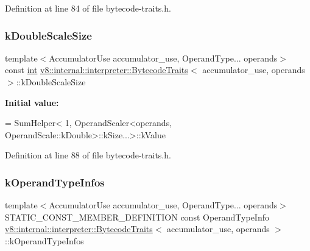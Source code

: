 Definition at line 84 of file bytecode-\/traits.\+h.

\mbox{\label{structv8_1_1internal_1_1interpreter_1_1BytecodeTraits_a973546ad40ad6f4e7fb3cf04ead3ceab}} 
\subsubsection{\texorpdfstring{k\+Double\+Scale\+Size}{kDoubleScaleSize}}
{\footnotesize\ttfamily template$<$Accumulator\+Use accumulator\+\_\+use, Operand\+Type... operands$>$ \\
const \mbox{\hyperlink{classint}{int}} \mbox{\hyperlink{structv8_1_1internal_1_1interpreter_1_1BytecodeTraits}{v8\+::internal\+::interpreter\+::\+Bytecode\+Traits}}$<$ accumulator\+\_\+use, operands $>$\+::k\+Double\+Scale\+Size\hspace{0.3cm}{\ttfamily [static]}}

{\bfseries Initial value\+:}
\begin{DoxyCode}
= SumHelper<
      1, OperandScaler<operands, OperandScale::kDouble>::kSize...>::kValue
\end{DoxyCode}


Definition at line 88 of file bytecode-\/traits.\+h.

\mbox{\label{structv8_1_1internal_1_1interpreter_1_1BytecodeTraits_a59e7189f4d1360082f3a11a61241ca11}} 
\subsubsection{\texorpdfstring{k\+Operand\+Type\+Infos}{kOperandTypeInfos}}
{\footnotesize\ttfamily template$<$Accumulator\+Use accumulator\+\_\+use, Operand\+Type... operands$>$ \\
S\+T\+A\+T\+I\+C\+\_\+\+C\+O\+N\+S\+T\+\_\+\+M\+E\+M\+B\+E\+R\+\_\+\+D\+E\+F\+I\+N\+I\+T\+I\+ON const Operand\+Type\+Info \mbox{\hyperlink{structv8_1_1internal_1_1interpreter_1_1BytecodeTraits}{v8\+::internal\+::interpreter\+::\+Bytecode\+Traits}}$<$ accumulator\+\_\+use, operands $>$\+::k\+Operand\+Type\+Infos\hspace{0.3cm}{\ttfamily [static]}}

